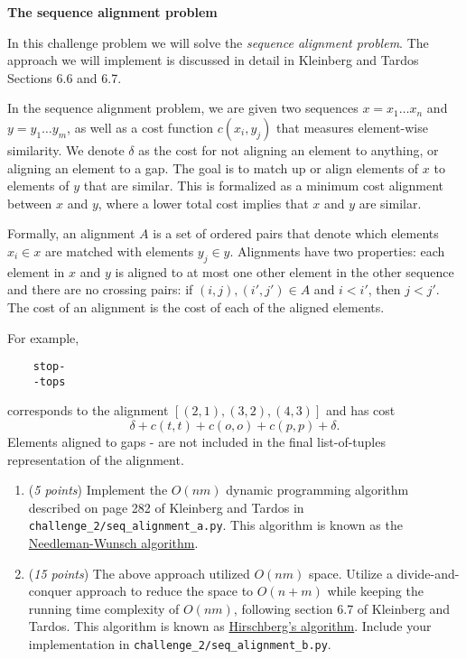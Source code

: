 \documentclass{hw}
\begin{document}
\begin{challenge}
\textbf{The sequence alignment problem}

In this challenge problem
we will solve the {\em sequence alignment problem}.
The approach we will implement is discussed in detail
in Kleinberg and Tardos Sections 6.6 and 6.7.

In the sequence alignment problem, we are given two sequences $x=x_1\ldots x_n$ and
$y=y_1\ldots y_m$, as well as a cost function $c(x_i,y_j)$ that measures element-wise similarity.
We denote $\delta$ as the cost for not aligning an element to anything,
or aligning an element to a gap.
The goal is to match up or align elements of $x$ to elements of $y$ that are similar.
This is formalized as a minimum cost alignment between $x$ and $y$,
where a lower total cost implies that $x$ and $y$ are similar.

Formally, an alignment $A$ is a set of ordered pairs that denote which elements $x_i \in x$ are matched with elements $y_j \in y$.
Alignments have two properties:
each element in $x$ and $y$ is aligned to at most one other element in the other sequence
and there are no crossing pairs: if $(i, j), (i', j') \in A$ and $i < i'$, then $j < j'$.
The cost of an alignment is the cost of each of the aligned elements. 

For example,
\begin{verbatim}
    stop-
    -tops
\end{verbatim}
corresponds to the alignment $[(2,1), (3,2), (4,3)]$ and has cost
$$\delta + c(t,t) + c(o,o) + c(p,p) + \delta.$$
Elements aligned to gaps - are not included in the final list-of-tuples representation of the alignment.

\begin{enumerate}[label={(\alph*)}]
\item(\textit{5 points})
Implement the $O(nm)$ dynamic programming algorithm described on page 282 of Kleinberg and Tardos in \texttt{challenge\_2/seq\_alignment\_a.py}.
This algorithm is known as the \href{https://en.wikipedia.org/wiki/Needleman-Wunsch\_algorithm}{Needleman-Wunsch algorithm}.


\item(\textit{15 points})
The above approach utilized $O(nm)$ space.
Utilize a divide-and-conquer approach to reduce the space to $O(n+m)$
while keeping the running time complexity of $O(nm)$,
following section 6.7 of Kleinberg and Tardos.
This algorithm is known as \href{https://en.wikipedia.org/wiki/Hirschberg's\_algorithm}{Hirschberg's algorithm}.
Include your implementation in \texttt{challenge\_2/seq\_alignment\_b.py}.
\end{enumerate}


\end{challenge}
\end{document}
